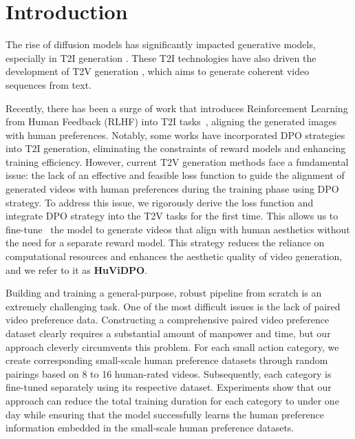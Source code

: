 \section{Introduction}
\label{sec:intro}

The rise of diffusion models has significantly impacted generative models, especially in T2I generation \cite{nichol2021glide,ramesh2022hierarchical,saharia2022photorealistic,rombach2022high}. These T2I technologies have also driven the development of T2V generation \cite{he2022latent,guo2023animatediff,wu2021godiva,yu2022generating,wu2023lamp}, which aims to generate coherent video sequences from text.

Recently, there has been a surge of work that introduces Reinforcement Learning from Human Feedback (RLHF) into T2I tasks~\cite{lee2023aligning,fan2024reinforcement}, aligning the generated images with human preferences. Notably, some works \cite{wallace2024diffusion,yang2024using} have incorporated DPO strategies into T2I generation, eliminating the constraints of reward models and enhancing training efficiency.
However, current T2V generation methods face a fundamental issue: the lack of an effective and feasible loss function to guide the alignment of generated videos with human preferences during the training phase using DPO strategy. To address this issue, we rigorously derive the loss function and integrate DPO strategy into the T2V tasks for the first time. This allows us to fine-tune~\cite{an2023latent,ge2023preserve,ho2022imagen,luo2023videofusion} the model to generate videos that align with human aesthetics without the need for a separate reward model. This strategy reduces the reliance on computational resources and enhances the aesthetic quality of video generation, and we refer to it as \textbf{HuViDPO}.

Building and training a general-purpose, robust pipeline from scratch is an extremely challenging task. One of the most difficult issues is the lack of paired video preference data. Constructing a comprehensive paired video preference dataset clearly requires a substantial amount of manpower and time, but our approach cleverly circumvents this problem. For each small action category, we create corresponding small-scale human preference datasets through random pairings based on 8 to 16 human-rated videos. Subsequently, each category is fine-tuned separately using its respective dataset. Experiments show that our approach can reduce the total training duration for each category to under one day while ensuring that the model successfully learns the human preference information embedded in the small-scale human preference datasets.

